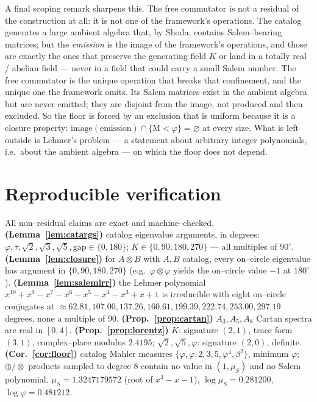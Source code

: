 \documentclass[11pt]{article}
\theoremstyle{plain}
\theoremstyle{definition}
\theoremstyle{remark}
\newcommand{\Mah}{\mathrm{M}}
\begin{document}
\medskip\noindent A final scoping remark sharpens this. The free commutator is not a residual of the construction at all: it is not one of the framework's operations. The catalog generates a large ambient algebra that, by Shoda, contains Salem--bearing matrices; but the \emph{emission} is the image of the framework's operations, and those are exactly the ones that preserve the generating field $K$ or land in a totally real / abelian field --- never in a field that could carry a small Salem number. The free commutator is the unique operation that breaks that confinement, and the unique one the framework omits. Its Salem matrices exist in the ambient algebra but are never emitted; they are disjoint from the image, not produced and then excluded. So the floor is forced by an exclusion that is uniform because it is a closure property: $\operatorname{image(emission)}\cap\{\Mah<\varphi\}=\varnothing$ at every size. What is left outside is Lehmer's problem --- a statement about arbitrary integer polynomials, i.e.\ about the ambient algebra --- on which the floor does not depend.

\appendix
\section{Reproducible verification}\label{app:emit}

All non--residual claims are exact and machine--checked. \textbf{(Lemma~\ref{lem:catargs})} catalog eigenvalue arguments, in degrees: $\varphi,\tau,\sqrt2,\sqrt3,\sqrt5,\mathrm{gap}\in\{0,180\}$; $K\in\{0,90,180,270\}$ --- all multiples of $90^\circ$. \textbf{(Lemma~\ref{lem:closure})} for $A\otimes B$ with $A,B$ catalog, every on--circle eigenvalue has argument in $\{0,90,180,270\}$ (e.g.\ $\varphi\otimes\varphi$ yields the on--circle value $-1$ at $180^\circ$). \textbf{(Lemma~\ref{lem:salemirr})} the Lehmer polynomial $x^{10}+x^9-x^7-x^6-x^5-x^4-x^3+x+1$ is irreducible with eight on--circle conjugates at $\approx62.81,107.00,137.26,160.61,199.39,222.74,253.00,297.19$ degrees, none a multiple of $90$. \textbf{(Prop.~\ref{prop:cartan})} $A_3,A_5,A_8$ Cartan spectra are real in $[0,4]$. \textbf{(Prop.~\ref{prop:lorentz})} $K$: signature $(2,1)$, trace form $(3,1)$, complex--place modulus $2.4195$; $\sqrt2,\sqrt5,\varphi$: signature $(2,0)$, definite. \textbf{(Cor.~\ref{cor:floor})} catalog Mahler measures $\{\varphi,\varphi,2,3,5,\varphi^4,\beta^2\}$, minimum $\varphi$; $\oplus/\otimes$ products sampled to degree $8$ contain no value in $(1,\mu_S)$ and no Salem polynomial. $\mu_S=1.3247179572$ (root of $x^3-x-1$), $\log\mu_S=0.281200$, $\log\varphi=0.481212$.
\end{document}
